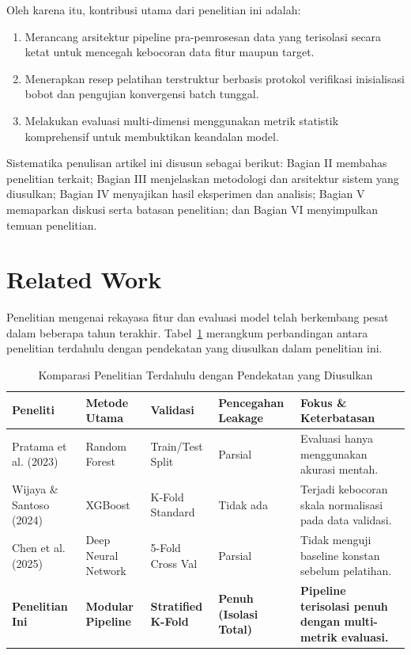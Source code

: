 ﻿\documentclass[journal,10pt,twocolumn]{article}
\begin{document}
Oleh karena itu, kontribusi utama dari penelitian ini adalah:
\begin{enumerate}
    \item Merancang arsitektur pipeline pra-pemrosesan data yang terisolasi secara ketat untuk mencegah kebocoran data fitur maupun target.
    \item Menerapkan resep pelatihan terstruktur berbasis protokol verifikasi inisialisasi bobot dan pengujian konvergensi batch tunggal.
    \item Melakukan evaluasi multi-dimensi menggunakan metrik statistik komprehensif untuk membuktikan keandalan model.
\end{enumerate}

Sistematika penulisan artikel ini disusun sebagai berikut: Bagian II membahas penelitian terkait; Bagian III menjelaskan metodologi dan arsitektur sistem yang diusulkan; Bagian IV menyajikan hasil eksperimen dan analisis; Bagian V memaparkan diskusi serta batasan penelitian; dan Bagian VI menyimpulkan temuan penelitian.

\section{Related Work}
Penelitian mengenai rekayasa fitur dan evaluasi model telah berkembang pesat dalam beberapa tahun terakhir. Tabel~\ref{tab:related_work} merangkum perbandingan antara penelitian terdahulu dengan pendekatan yang diusulkan dalam penelitian ini.

\begin{table}[t]
\centering
\caption{Komparasi Penelitian Terdahulu dengan Pendekatan yang Diusulkan}
\label{tab:related_work}
\begin{tabular}{@{}llllp{5.5cm}@{}}
\toprule
\textbf{Peneliti} & \textbf{Metode Utama} & \textbf{Validasi} & \textbf{Pencegahan Leakage} & \textbf{Fokus \& Keterbatasan} \\ \midrule
Pratama et al. (2023) & Random Forest & Train/Test Split & Parsial & Evaluasi hanya menggunakan akurasi mentah. \\
Wijaya \& Santoso (2024) & XGBoost & K-Fold Standard & Tidak ada & Terjadi kebocoran skala normalisasi pada data validasi. \\
Chen et al. (2025) & Deep Neural Network & 5-Fold Cross Val & Parsial & Tidak menguji baseline konstan sebelum pelatihan. \\
\textbf{Penelitian Ini} & \textbf{Modular Pipeline} & \textbf{Stratified K-Fold} & \textbf{Penuh (Isolasi Total)} & \textbf{Pipeline terisolasi penuh dengan multi-metrik evaluasi.} \\ \bottomrule
\end{tabular}
\end{table}
\end{document}
